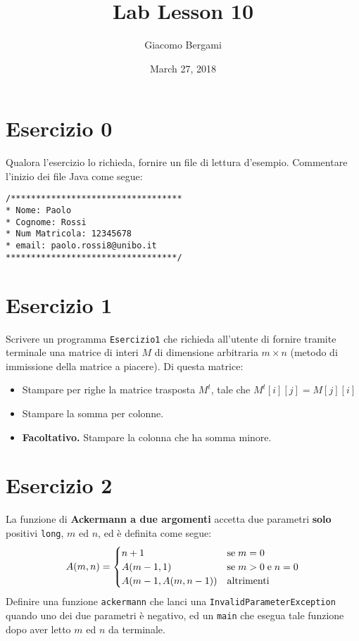 \documentclass[]{scrartcl}
\title{Lab Lesson 10}
\date{March 27, 2018}
\author{Giacomo Bergami}
\begin{document}
\maketitle

\section*{Esercizio 0}
Qualora l'esercizio lo richieda, fornire un file di lettura d'esempio. Commentare l'inizio dei file Java come segue:
\begin{verbatim}
/**********************************
* Nome: Paolo
* Cognome: Rossi
* Num Matricola: 12345678
* email: paolo.rossi8@unibo.it
**********************************/
\end{verbatim}


\section*{Esercizio 1}
Scrivere un programma \texttt{Esercizio1} che richieda all'utente di fornire tramite terminale una matrice di interi $M$ di dimensione arbitraria $m\times n$ (metodo di immissione della matrice a piacere). Di questa matrice:
\begin{itemize}
\item Stampare per righe la matrice trasposta $M^t$, tale che $M^t[i][j] = M[j][i]$
\item Stampare la somma per colonne.
\item \textbf{Facoltativo.} Stampare la colonna che ha somma minore.
\end{itemize}

\section*{Esercizio 2}

La funzione di \textbf{Ackermann a due argomenti} accetta due parametri \textbf{solo} positivi \texttt{long}, $m$ ed $n$, ed è definita come segue:
\[A(m,n)=\begin{cases}
n+1 & \textup{se}\;m=0\\
A(m-1,1) & \textup{se}\;m>0\;\textup{e}\;n=0\\
A(m-1,A(m,n-1)) & \textup{altrimenti}\\
\end{cases}\]
Definire una funzione \texttt{ackermann} che lanci una \texttt{InvalidParameterException} quando uno dei due parametri è negativo, ed un \texttt{main} che esegua tale funzione dopo aver letto $m$ ed $n$ da terminale. 
\medskip
\end{document}
